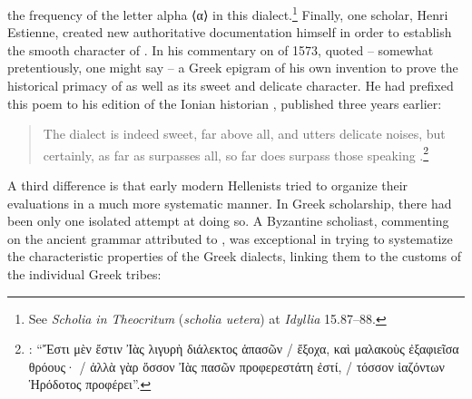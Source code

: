 the frequency of the letter alpha ⟨α⟩ in this dialect.\footnote{See \textit{Scholia in Theocritum} (\textit{scholia uetera}) at \textit{Idyllia} 15.87–88.} Finally, one scholar, Henri Estienne, created new authoritative documentation himself in order to establish the smooth character of . In his commentary on  of 1573, \citet[ii\textsc{\textsuperscript{r}}]{Estienne1573} quoted – somewhat pretentiously, one might say – a Greek epigram of his own invention to prove the historical primacy of  as well as its sweet and delicate character. He had prefixed this poem to his edition of the Ionian historian , published three years earlier:

\begin{quote}\raggedright
The  dialect is indeed sweet, far above all,\linebreak
and utters delicate noises, but certainly,\linebreak
as far as  surpasses all, so far\linebreak
does  surpass those speaking .\footnote{\citet[8]{Estienne1570}: “Ἔστι μὲν ἔστιν Ἰὰς λιγυρὴ διάλεκτος ἁπασῶν / ἔξοχα, καὶ μαλακοὺς ἐξαφιεῖσα θρόους· / ἀλλὰ γὰρ ὅσσον Ἰὰς πασῶν προφερεστάτη ἐστί, / τόσσον ἰαζόντων Ἡρόδοτος προφέρει”.}
\end{quote}

A third difference is that early modern Hellenists tried to organize their evaluations in a much more systematic manner. In Greek scholarship, there had been only one isolated attempt at doing so. A Byzantine scholiast, commenting on the ancient grammar attributed to , was exceptional in trying to systematize the characteristic properties of the Greek dialects, linking them to the customs of the individual Greek tribes:

